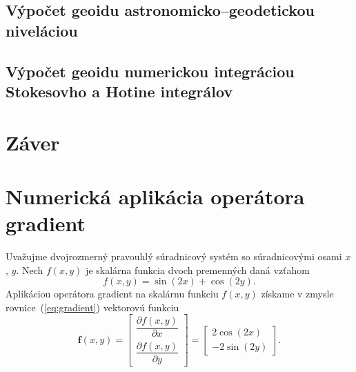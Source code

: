 \documentclass[a4paper, 12pt]{book}
\let\vec\mathbf
\begin{document}

\section{Výpočet geoidu astronomicko--geodetickou niveláciou}







\section{Výpočet geoidu numerickou integráciou Stokesovho a Hotine integrálov}







\chapter*{Záver}







\appendix
\chapter{Numerická aplikácia operátora gradient}
\label{app:numerical_application_of_gradient}

Uvažujme dvojrozmerný pravouhlý súradnicový systém so súradnicovými osami $x$, 
$y$.  Nech $f(x, y)$ je skalárna funkcia dvoch premenných daná vzťahom
%
\begin{equation}
\label{eq:f}
f(x, y) = \sin(2x) + \cos(2y){.}
\end{equation}
%
Aplikáciou operátora gradient na skalárnu funkciu $f(x, y)$ získame v zmysle 
rovnice~(\ref{eq:gradient}) vektorovú funkciu
%
\begin{equation}
\label{eq:gradf}
\vec f(x, y) =
\begin{bmatrix}
\dfrac{\partial f(x, y)}{\partial x} \\[2ex]
\dfrac{\partial f(x, y)}{\partial y}
\end{bmatrix}
=
\begin{bmatrix}
2 \cos(2x) \\[2ex]
-2 \sin(2y)
\end{bmatrix}
{.}
\end{equation}
\end{document}
